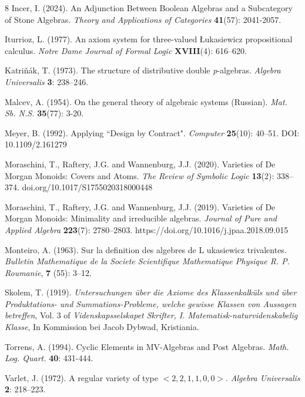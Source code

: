 \documentclass[a4paper,11pt]{article}
\theoremstyle{definition}
\begin{document}
\begin{thebibliography}{8}
Incer, I. (2024).
An Adjunction Between Boolean Algebras and a Subcategory of Stone Algebras. 
\emph{Theory and Applications of Categories} {\bf{41}}(57): 2041-2057.

Iturrioz, L. (1977). 
An axiom system for three-valued {\L}ukasiewicz propositional calculus. 
{\em{Notre Dame Journal of Formal Logic}} {\bf XVIII}(4): 616--620.
	
Katri\v{n}\'ak, T. (1973).
The structure of distributive double \emph{p}-algebras. 
\emph{Algebra Universalis} {\bf{3}}: 238--246.

 Malcev, A. (1954).
On the general theory of algebraic systems (Russian). 
\emph{Mat. Sb. N.S.} {\bf{35}}(77): 3-20. 

 Meyer, B. (1992).
Applying ``Design by Contract".
\emph{Computer} {\bf{25}}(10): 40--51. 
DOI: 10.1109/2.161279

Moraschini, T., Raftery, J.G. and Wannenburg, J.J. (2020).
Varieties of De Morgan Monoids: Covers and Atoms. 
{\em{The Review of Symbolic Logic}} {\bf{13}}(2): 338--374. 
doi.org/10.1017/S1755020318000448

Moraschini, T., Raftery, J.G. and Wannenburg, J.J. (2019).
Varieties of De Morgan Monoids: Minimality and irreducible algebras. 
\emph{Journal of Pure and Applied Algebra} {\bf 223}(7): 2780--2803.
https://doi.org/10.1016/j.jpaa.2018.09.015

Monteiro, A. (1963).
Sur la definition des algebres de L ukasiewicz trivalentes.
{\em{Bulletin Mathematique de la Societe Scientifique Mathematique Physique R. P. Roumanie}}, {\bf{7}} (55): 3--12.

Skolem, T. (1919). 
\emph{Untersuchungen \"uber die Axiome des Klassenkalk\"uls und \"uber
Produktations- und Summations-Probleme, welche gewisse Klassen von Aussagen betreffen}, Vol. 3 of \emph{Videnskapsselskapet Skrifter, I. Matematisk-naturvidenskabelig Klasse}, In
Kommission bei Jacob Dybwad, Kristiania.

Torrens, A. (1994).
Cyclic Elements in MV-Algebras and Post Algebras.
\emph{Math. Log. Quart.} {\bf{40}}: 431-444.

Varlet, J. (1972). 
A regular variety of type $<2, 2, 1, 1, 0, 0>$.
\emph{Algebra Universalis} {\bf{2}}: 218--223.
	
\end{thebibliography}
\end{document}
